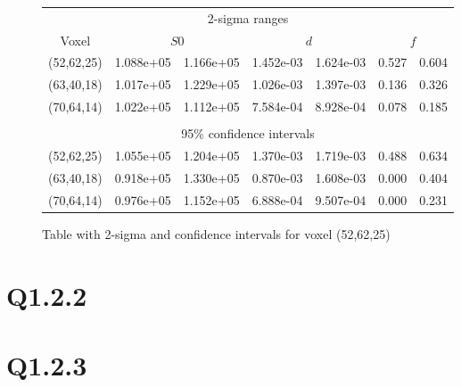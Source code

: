 \documentclass[11pt,a4paper,oneside]{report}
\begin{document}
\begin{figure}[H]
\begin{center}
\begin{tabular}{c | c | c | c | c | c | c}
\multicolumn{7}{c}{2-sigma ranges}\\
 Voxel & \multicolumn{2}{c|}{$S0$} & \multicolumn{2}{c|}{$d$} & \multicolumn{2}{c}{$f$}\\ 
 \hline
 (52,62,25) & 1.088e+05 & 1.166e+05 & 1.452e-03 & 1.624e-03 & 0.527 & 0.604\\
 (63,40,18) & 1.017e+05 & 1.229e+05 & 1.026e-03 & 1.397e-03 & 0.136 & 0.326\\
 (70,64,14) & 1.022e+05 & 1.112e+05 & 7.584e-04 & 8.928e-04 & 0.078 & 0.185\\
  \hline
  \multicolumn{7}{c}{}\\
  \multicolumn{7}{c}{95\% confidence intervals}\\
 (52,62,25) & 1.055e+05 & 1.204e+05 & 1.370e-03 & 1.719e-03 & 0.488 & 0.634\\
 (63,40,18) & 0.918e+05 & 1.330e+05 & 0.870e-03 & 1.608e-03 & 0.000 & 0.404\\
 (70,64,14) & 0.976e+05 & 1.152e+05 & 6.888e-04 & 9.507e-04 & 0.000 & 0.231\\
\end{tabular}
\caption{Table with 2-sigma and confidence intervals for voxel (52,62,25)}
\label{q121tab}
\end{center}
\end{figure}


\section*{Q1.2.2}

\section*{Q1.2.3}
\end{document}
